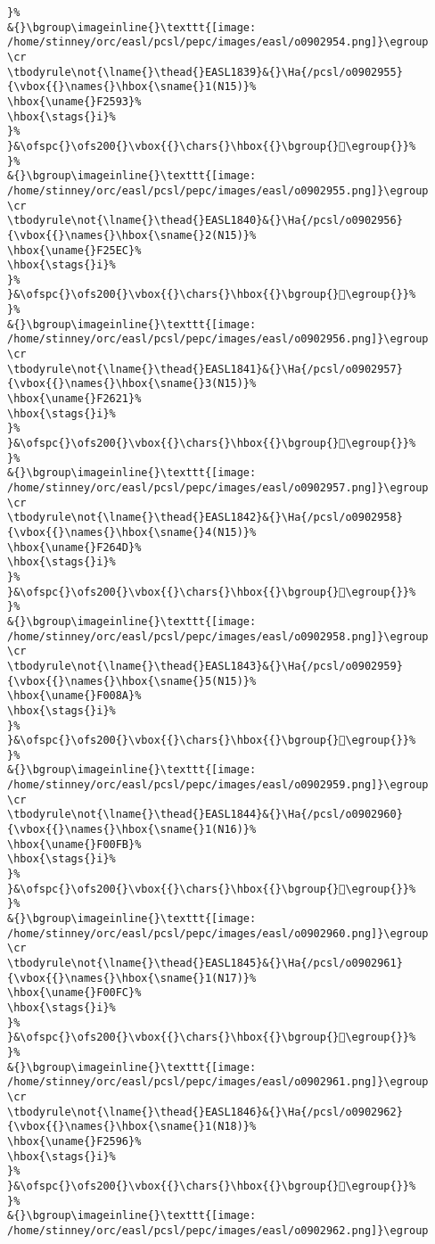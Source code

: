 \begin{verbatim}
}%
&{}\bgroup\imageinline{}\texttt{[image: /home/stinney/orc/easl/pcsl/pepc/images/easl/o0902954.png]}\egroup
\cr
\tbodyrule\not{\lname{}\thead{}EASL1839}&{}\Ha{/pcsl/o0902955}{\vbox{{}\names{}\hbox{\sname{}1(N15)}%
\hbox{\uname{}F2593}%
\hbox{\stags{}i}%
}%
}&\ofspc{}\ofs200{}\vbox{{}\chars{}\hbox{{}\bgroup{}󲖓\egroup{}}%
}%
&{}\bgroup\imageinline{}\texttt{[image: /home/stinney/orc/easl/pcsl/pepc/images/easl/o0902955.png]}\egroup
\cr
\tbodyrule\not{\lname{}\thead{}EASL1840}&{}\Ha{/pcsl/o0902956}{\vbox{{}\names{}\hbox{\sname{}2(N15)}%
\hbox{\uname{}F25EC}%
\hbox{\stags{}i}%
}%
}&\ofspc{}\ofs200{}\vbox{{}\chars{}\hbox{{}\bgroup{}󲗬\egroup{}}%
}%
&{}\bgroup\imageinline{}\texttt{[image: /home/stinney/orc/easl/pcsl/pepc/images/easl/o0902956.png]}\egroup
\cr
\tbodyrule\not{\lname{}\thead{}EASL1841}&{}\Ha{/pcsl/o0902957}{\vbox{{}\names{}\hbox{\sname{}3(N15)}%
\hbox{\uname{}F2621}%
\hbox{\stags{}i}%
}%
}&\ofspc{}\ofs200{}\vbox{{}\chars{}\hbox{{}\bgroup{}󲘡\egroup{}}%
}%
&{}\bgroup\imageinline{}\texttt{[image: /home/stinney/orc/easl/pcsl/pepc/images/easl/o0902957.png]}\egroup
\cr
\tbodyrule\not{\lname{}\thead{}EASL1842}&{}\Ha{/pcsl/o0902958}{\vbox{{}\names{}\hbox{\sname{}4(N15)}%
\hbox{\uname{}F264D}%
\hbox{\stags{}i}%
}%
}&\ofspc{}\ofs200{}\vbox{{}\chars{}\hbox{{}\bgroup{}󲙍\egroup{}}%
}%
&{}\bgroup\imageinline{}\texttt{[image: /home/stinney/orc/easl/pcsl/pepc/images/easl/o0902958.png]}\egroup
\cr
\tbodyrule\not{\lname{}\thead{}EASL1843}&{}\Ha{/pcsl/o0902959}{\vbox{{}\names{}\hbox{\sname{}5(N15)}%
\hbox{\uname{}F008A}%
\hbox{\stags{}i}%
}%
}&\ofspc{}\ofs200{}\vbox{{}\chars{}\hbox{{}\bgroup{}󰂊\egroup{}}%
}%
&{}\bgroup\imageinline{}\texttt{[image: /home/stinney/orc/easl/pcsl/pepc/images/easl/o0902959.png]}\egroup
\cr
\tbodyrule\not{\lname{}\thead{}EASL1844}&{}\Ha{/pcsl/o0902960}{\vbox{{}\names{}\hbox{\sname{}1(N16)}%
\hbox{\uname{}F00FB}%
\hbox{\stags{}i}%
}%
}&\ofspc{}\ofs200{}\vbox{{}\chars{}\hbox{{}\bgroup{}󰃻\egroup{}}%
}%
&{}\bgroup\imageinline{}\texttt{[image: /home/stinney/orc/easl/pcsl/pepc/images/easl/o0902960.png]}\egroup
\cr
\tbodyrule\not{\lname{}\thead{}EASL1845}&{}\Ha{/pcsl/o0902961}{\vbox{{}\names{}\hbox{\sname{}1(N17)}%
\hbox{\uname{}F00FC}%
\hbox{\stags{}i}%
}%
}&\ofspc{}\ofs200{}\vbox{{}\chars{}\hbox{{}\bgroup{}󰃼\egroup{}}%
}%
&{}\bgroup\imageinline{}\texttt{[image: /home/stinney/orc/easl/pcsl/pepc/images/easl/o0902961.png]}\egroup
\cr
\tbodyrule\not{\lname{}\thead{}EASL1846}&{}\Ha{/pcsl/o0902962}{\vbox{{}\names{}\hbox{\sname{}1(N18)}%
\hbox{\uname{}F2596}%
\hbox{\stags{}i}%
}%
}&\ofspc{}\ofs200{}\vbox{{}\chars{}\hbox{{}\bgroup{}󲖖\egroup{}}%
}%
&{}\bgroup\imageinline{}\texttt{[image: /home/stinney/orc/easl/pcsl/pepc/images/easl/o0902962.png]}\egroup

\end{verbatim}
